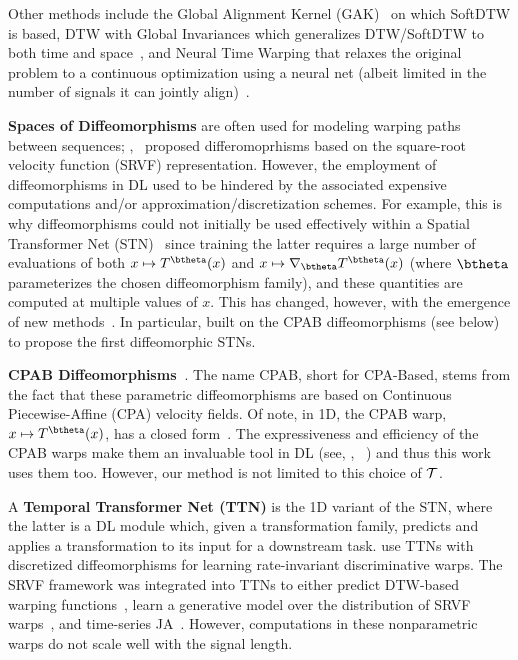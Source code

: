 Other methods include the Global Alignment Kernel (GAK)~\cite{cuturi:2011:gak} on which SoftDTW is based, DTW with Global Invariances
 which generalizes DTW/SoftDTW to both time and space~\cite{Vayer:2020:time}, and 
Neural Time Warping %
that relaxes the original problem
to a continuous optimization using a neural net (albeit limited in the number of signals it can jointly align)~\cite{kawano:ICASSP:2020:neural}. 

\textbf{Spaces of Diffeomorphisms} are often used for modeling warping paths between sequences;  \eg,~\cite{Srivastava:2010:shape,srivastava:2011:registration} proposed differomoprhisms based on the square-root velocity function (SRVF) representation. 
However, the employment of diffeomorphisms in DL used to be hindered by the associated expensive computations and/or approximation/discretization schemes. For example, this is why diffeomorphisms could not initially be used effectively within a
Spatial Transformer Net (STN)~\cite{Jaderberg:NIPS:2015:spatial} since training the latter requires a large number of evaluations of both $x\mapsto T^\btheta(x)$ and $x\mapsto \nabla_\btheta T^\btheta(x)$ (where $\btheta$ 
parameterizes the chosen diffeomorphism family), and these quantities are computed at multiple values of $x$.   
 This has changed, however, with the emergence of new methods~\cite{Skafte:CVPR:2018:DDTN,Balakrishnan:CVPR:2018:UnsupervisedDeformable}. 
In particular, \cite{Skafte:CVPR:2018:DDTN} built on the CPAB diffeomorphisms (see below) 
to propose the first diffeomorphic STNs.

%

\textbf{CPAB Diffeomorphisms~\cite{Freifeld:ICCV:2015:CPAB,Freifeld:PAMI:2017:CPAB}}. 
The name CPAB, short for CPA-Based, stems from the fact that these parametric diffeomorphisms are based on Continuous Piecewise-Affine (CPA) velocity fields. Of note, in 1D, the CPAB warp, $x\mapsto T^\btheta(x)$, has a closed form~\cite{Freifeld:ICCV:2015:CPAB}. 
The expressiveness and efficiency of the CPAB warps make them an invaluable tool in DL (see, \eg, ~\cite{Hauberg:AISTATS:2016:DA,Skafte:CVPR:2018:DDTN,Skafte:NIPS:2019:explicit,Shapira:NIPS:2019:DTAN,kaufman:icip:2021:cyclic,Shacht:2021:single,Schwobel:2022:UAI:pstn,Martinez:ICML:2022:closed, Neifar:2022l:everaging,Kryeem:ICCV:2023:personalized,Wang:AAAI:2024:Animation,kryeem:CVIU:2025:action,Chelly:ECCV:2024:ditac,Mantri:NIPS:2024:DIGRAF}) and thus this work uses them too.  
However, our method is not limited to this choice of $\mathcal{T}$.

%
A \textbf{Temporal Transformer Net (TTN)} is the 1D variant of the STN, where the latter is a DL module which, given a transformation family, predicts and applies a transformation to its input for a downstream task. 
\citet{Lohit:CVPR:2019:temporal} use TTNs with discretized diffeomorphisms for learning rate-invariant discriminative warps. 
The SRVF framework was integrated into TTNs to either predict DTW-based warping functions~\cite{nunez:CVPRW:2020:deep}, learn a generative model over the distribution of SRVF warps~\cite{Nunez:2021:srvfnet}, and time-series JA~\cite{Chen:2021:srvfregnet}. However, computations in these nonparametric warps do not scale well with the signal length.

